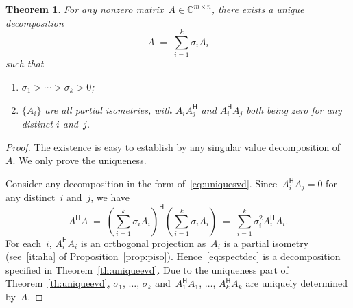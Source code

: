 \documentclass[11pt,a4paper]{article}  %
\numberwithin{equation}{section}
\newtheorem{theorem}{Theorem}%
\theoremstyle{definition}
\def\CC{\mathbb{C}}
\newcommand{\hmt}{{\scriptscriptstyle{{\mathsf{H}}}}}
\begin{document}
\begin{theorem}
  \label{th:uniquesvd}
  For any nonzero matrix~$A\in\CC^{m\times n}$, there exists a unique decomposition
  \begin{equation}
    \label{eq:uniquesvd}
    A \;=\; \sum_{i=1}^k \sigma_i A_i
  \end{equation}
  such that
  \begin{enumerate}[leftmargin=1.5em]
    \item $\sigma_1>\cdots >\sigma_k> 0$;
    \item $\{A_i\}$ are all partial isometries, with
    $A_i A_j^\hmt$ and $A_i^\hmt A_j$ both being zero for any distinct $i$ and~$j$.
  \end{enumerate}
\end{theorem}

\begin{proof}
  The existence is easy to establish by any singular value decomposition of~$A$. We only prove the
  uniqueness.

  Consider any decomposition in the form of~\eqref{eq:uniquesvd}.
  Since~$A_i^\hmt A_j = 0$ for any distinct~$i$ and~$j$, we have
  \begin{equation}
    \label{eq:spectdec}
    A^\hmt A \;=\;
    \left(\sum_{i=1}^k \sigma_iA_i\right)^\hmt
    \left(\sum_{i=1}^k \sigma_iA_i\right)
    \;=\; \sum_{i=1}^k \sigma_i^2 A_i^\hmt A_i.
  \end{equation}
  For each~$i$, $A_i^\hmt A_i$ is an orthogonal projection as~$A_i$ is a partial isometry (see~\ref{it:aha} of
  Proposition~\ref{prop:piso}).
  Hence~\eqref{eq:spectdec} is a decomposition specified in Theorem~\ref{th:uniqueevd}. Due to the
  uniqueness part of Theorem~\ref{th:uniqueevd}, $\sigma_1$, $\dots$,
  $\sigma_k$ and~$A_1^\hmt A_1$, $\dots$, $A_k^\hmt A_k$  are uniquely determined by~$A$.


\end{proof}
\end{document}
